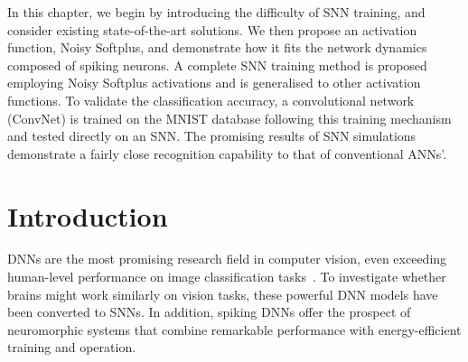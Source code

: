 
In this chapter, we begin by introducing the difficulty of SNN training, and consider existing state-of-the-art solutions.
We then propose an activation function, Noisy Softplus, and demonstrate how it fits the network dynamics composed of spiking neurons.
A complete SNN training method is proposed employing Noisy Softplus activations and is generalised to other activation functions.
To validate the classification accuracy, a convolutional network (ConvNet) is trained on the MNIST database following this training mechanism and tested directly on an SNN.
The promising results of SNN simulations demonstrate a fairly close recognition capability to that of conventional ANNs'.

\section{Introduction}	
DNNs are the most promising research field in computer vision, even exceeding human-level performance on image classification tasks~\cite{he2015delving}.
To investigate whether brains might work similarly on vision tasks, these powerful DNN models have been converted to SNNs.
In addition, spiking DNNs offer the prospect of neuromorphic systems that combine remarkable performance with energy-efficient training and operation.

